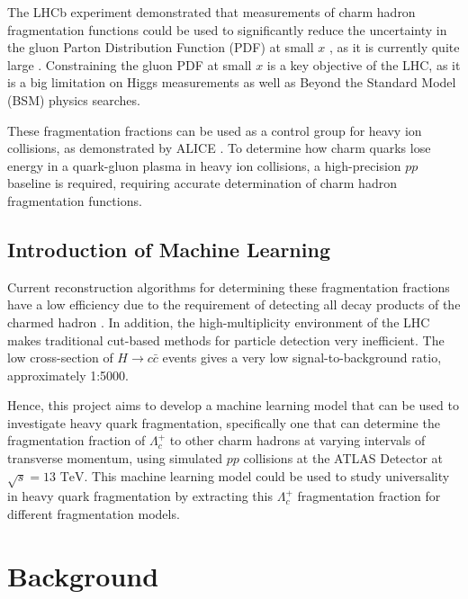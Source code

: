 \documentclass[12pt]{article}
\begin{document}
The LHCb experiment demonstrated that measurements of charm hadron fragmentation functions could be used to significantly reduce the uncertainty in the gluon Parton Distribution Function (PDF) at small $x$ \cite{charm_production}, as it is currently quite large \cite{xFitter}. Constraining the gluon PDF at small $x$ is a key objective of the LHC, as it is a big limitation on Higgs measurements as well as Beyond the Standard Model (BSM) physics searches.

These fragmentation fractions can be used as a control group for heavy ion collisions, as demonstrated by ALICE \cite{alice_pb}. To determine how charm quarks lose energy in a quark-gluon plasma in heavy ion collisions, a high-precision $pp$ baseline is required, requiring accurate determination of charm hadron fragmentation functions.

\subsection{Introduction of Machine Learning}
Current reconstruction algorithms for determining these fragmentation fractions have a low efficiency due to the requirement of detecting all decay products of the charmed hadron \cite{fragfrac}. In addition, the high-multiplicity environment of the LHC makes traditional cut-based methods for particle detection very inefficient. The low cross-section of $H \rightarrow c\bar{c}$ events gives a very low signal-to-background ratio, approximately 1:5000.

Hence, this project aims to develop a machine learning model that can be used to investigate heavy quark fragmentation, specifically one that can determine the fragmentation fraction of $\Lambda_c^+$ to other charm hadrons at varying intervals of transverse momentum, using simulated $pp$ collisions at the ATLAS Detector at $\sqrt{s} = 13 \text{ TeV}$. This machine learning model could be used to study universality in heavy quark fragmentation by extracting this $\Lambda_c^+$ fragmentation fraction for different fragmentation models.






\newpage
\section{Background}
\label{sec:background}
\end{document}
